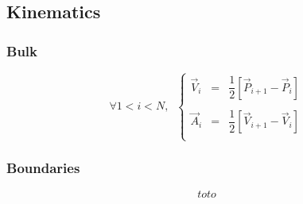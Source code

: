 \documentclass[aps,12pt]{revtex4}
\begin{document}
\subsection{Kinematics}

\subsubsection{Bulk}

\begin{equation}
\forall 1 < i < N, \;\;
\left\lbrace
\begin{array}{rcl}
	\vec{V}_i & = & \dfrac{1}{2} \left[ \vec{P}_{i+1} - \vec{P}_i\right]\\
	\\
	\vec{A}_i & = & \dfrac{1}{2} \left[ \vec{V}_{i+1} - \vec{V}_i\right]\\
\end{array}
\right.
\end{equation}

\subsubsection{Boundaries}

\begin{equation}
	toto
\end{equation}
\end{document}
